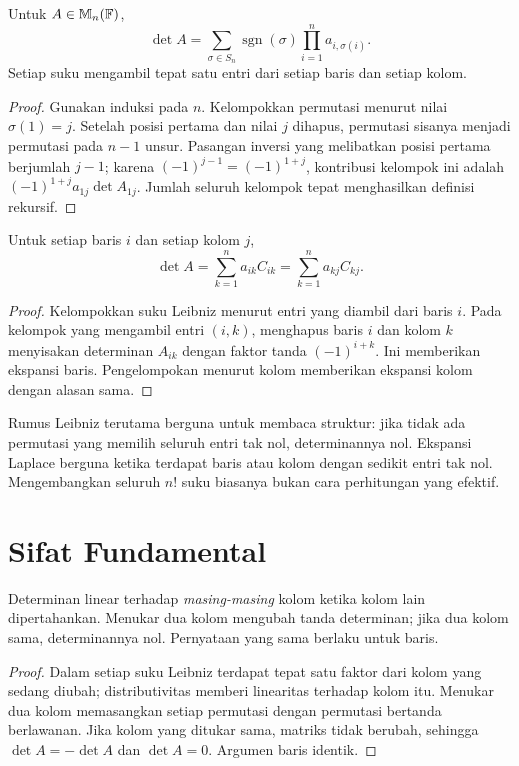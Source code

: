 \begin{thm}
      \label{det:leibniz}
      Untuk $A\in\mathbb{M}_n(\mathbb{F})$,
      \[
            \det A=\sum_{\sigma\in S_n}\operatorname{sgn}(\sigma)
            \prod_{i=1}^n a_{i,\sigma(i)}.
      \]
      Setiap suku mengambil tepat satu entri dari setiap baris dan setiap kolom.
\end{thm}
\begin{proof}
      Gunakan induksi pada $n$. Kelompokkan permutasi menurut nilai
      $\sigma(1)=j$. Setelah posisi pertama dan nilai $j$ dihapus,
      permutasi sisanya menjadi permutasi pada $n-1$ unsur.
      Pasangan inversi yang melibatkan posisi pertama berjumlah $j-1$;
      karena $(-1)^{j-1}=(-1)^{1+j}$, kontribusi kelompok ini adalah
      $(-1)^{1+j}a_{1j}\det A_{1j}$.
      Jumlah seluruh kelompok tepat menghasilkan definisi rekursif.
\end{proof}

\begin{thm}
      \label{det:laplace}
      Untuk setiap baris $i$ dan setiap kolom $j$,
      \[
            \det A=\sum_{k=1}^n a_{ik}C_{ik}
            =\sum_{k=1}^n a_{kj}C_{kj}.
      \]
\end{thm}
\begin{proof}
      Kelompokkan suku Leibniz menurut entri yang diambil dari baris $i$.
      Pada kelompok yang mengambil entri $(i,k)$, menghapus baris $i$ dan
      kolom $k$ menyisakan determinan $A_{ik}$ dengan faktor tanda
      $(-1)^{i+k}$. Ini memberikan ekspansi baris.
      Pengelompokan menurut kolom memberikan ekspansi kolom dengan alasan sama.
\end{proof}

Rumus Leibniz terutama berguna untuk membaca struktur: jika tidak ada
permutasi yang memilih seluruh entri tak nol, determinannya nol.
Ekspansi Laplace berguna ketika terdapat baris atau kolom dengan sedikit
entri tak nol. Mengembangkan seluruh $n!$ suku biasanya bukan cara
perhitungan yang efektif.

\section{Sifat Fundamental}
\label{det:sifat}

\begin{thm}
      \label{det:multilinear}
      Determinan linear terhadap \emph{masing-masing} kolom ketika kolom
      lain dipertahankan. Menukar dua kolom mengubah tanda determinan;
      jika dua kolom sama, determinannya nol. Pernyataan yang sama berlaku
      untuk baris.
\end{thm}
\begin{proof}
      Dalam setiap suku Leibniz terdapat tepat satu faktor dari kolom yang
      sedang diubah; distributivitas memberi linearitas terhadap kolom itu.
      Menukar dua kolom memasangkan setiap permutasi dengan permutasi
      bertanda berlawanan. Jika kolom yang ditukar sama, matriks tidak
      berubah, sehingga $\det A=-\det A$ dan $\det A=0$.
      Argumen baris identik.
\end{proof}


